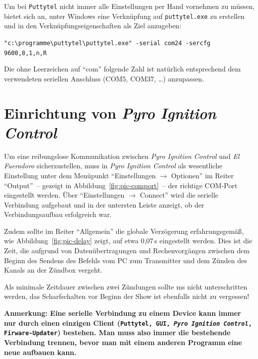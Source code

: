 \documentclass[pdftex, parskip, numbers=noenddot, toc=listof]{scrbook}
\newcommand{\pic}{\emph{Pyro Ignition Control}}
\newcommand{\anlage}{\emph{El Fueradoro}}
\begin{document}
			Um bei \texttt{Puttytel} nicht immer alle Einstellungen per Hand vornehmen zu müssen, bietet sich an, unter Windows eine Verknüpfung auf \texttt{puttytel.exe} zu erstellen und in den Ver\-knüpfungs\-eigen\-schaften als Ziel anzugeben:
			\begin{center}
				\verb|"c:\programme\puttytel\puttytel.exe" -serial com24 -sercfg 9600,8,1,n,R|
			\end{center}

			Die ohne Leerzeichen auf \enquote{com} folgende Zahl ist natürlich entsprechend dem verwendeten seriellen Anschluss (COM5, COM37, \dots) anzupassen.

		\section{Einrichtung von \pic}
			\label{sec:piceinrichtung}

			Um eine reibungslose Kommunikation zwischen {\pic} und {\anlage} sicherzustellen, muss in {\pic} als wesentliche Einstellung unter dem Menüpunkt \enquote{Einstellungen $\rightarrow$ Optionen} im Reiter \enquote{Output}~-- gezeigt in Abbildung~\ref{fig:pic-comport}~-- der richtige COM-Port eingestellt werden. Über \enquote{Einstellungen $\rightarrow$ Connect} wird die serielle Verbindung aufgebaut und in der untersten Leiste anzeigt, ob der Verbindungsaufbau erfolgreich war.

			Zudem sollte im Reiter \enquote{Allgemein} die globale Verzögerung erfahrungsgemäß, wie Abbildung~\ref{fig:pic-delay} zeigt, auf etwa 0{,}07\,s eingestellt werden. Dies ist die Zeit, die aufgrund von Datenübertragungen und Rechenvorgängen zwischen dem Beginn des Sendens des Befehls vom PC zum Transmitter und dem Zünden des Kanals an der Zündbox vergeht.

			Als minimale Zeitdauer zwischen zwei Zündungen sollte \unit[100]{ms} nicht unterschritten werden, das Scharfschalten vor Beginn der Show ist ebenfalls nicht zu vergessen!

			\textbf{Anmerkung: Eine serielle Verbindung zu einem Device kann immer nur durch einen einzigen Client (\texttt{Putty\-tel, GUI, {\pic}, Firware-Updater}) bestehen. Man muss also immer die bestehende Verbindung trennen, bevor man mit einem anderen Programm eine neue aufbauen kann.}
\end{document}

